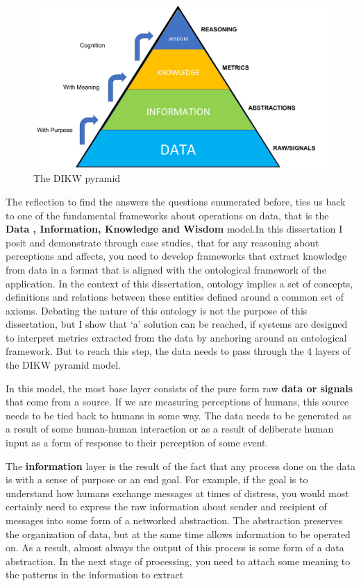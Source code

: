 \begin{figure}[t!]
    \centering
    \includegraphics[width=\columnwidth]{DIKW.pdf}
    \caption{The DIKW pyramid}
    \label{fig:dikw}
\end{figure}


The reflection to find the answers the questions enumerated before, ties us back to one of the fundamental frameworks about operations on data, that is the \textbf{Data , Information, Knowledge and Wisdom} model\cite{rowley2007wisdom}.In this dissertation I posit and demonstrate through case studies, that for any reasoning about perceptions and affects, you need to develop frameworks that extract knowledge from data in a format that is aligned with the ontological framework of the application. In the context of this dissertation, ontology implies a set of concepts, definitions and relations between these entities defined around a common set of axioms. Debating the nature of this ontology is not the purpose of this dissertation, but I show that `a' solution can be reached, if systems are designed to interpret metrics extracted from the data by anchoring around an ontological framework. But to reach this step, the data needs to pass through the 4 layers of the DIKW pyramid model.

In this model, the most base layer consists of the pure form raw \textbf{data or signals} that come from a source. If we are measuring perceptions of humans, this source needs to be tied back to humans in some way. The data needs to be generated as a result of some human-human interaction or as a result of deliberate human input as a form of response to their perception of some event. 

The \textbf{information} layer is the result of the fact that any process done on the data is with a sense of purpose or an end goal. For example, if the goal is to understand how humans exchange messages at times of distress, you would most certainly need to express the raw information about sender and recipient of messages into some form of a networked abstraction. The abstraction preserves the organization of data, but at the same time allows information to be operated on. As a result, almost always the output of this process is some form of a data abstraction. In the next stage of processing, you need to attach some meaning to the patterns in the information to extract 


